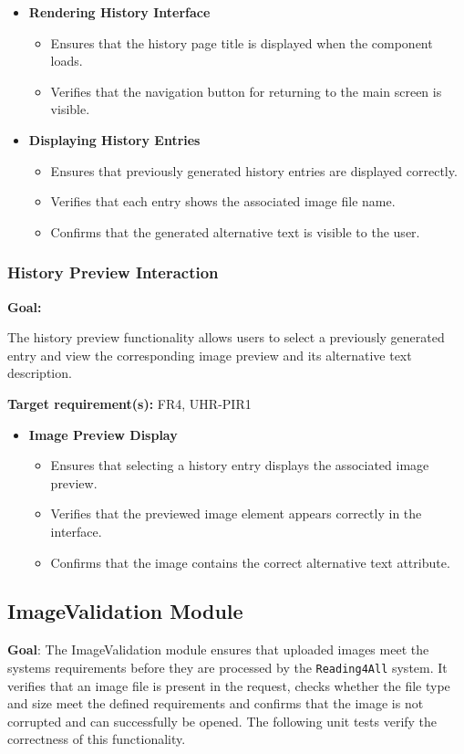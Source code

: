 \documentclass[12pt, titlepage]{article}
\begin{document}
\begin{itemize}

\item \textbf{Rendering History Interface}
\begin{itemize}
\item Ensures that the history page title is displayed when the component loads.
\item Verifies that the navigation button for returning to the main screen is visible.
\end{itemize}

\item \textbf{Displaying History Entries}
\begin{itemize}
\item Ensures that previously generated history entries are displayed correctly.
\item Verifies that each entry shows the associated image file name.
\item Confirms that the generated alternative text is visible to the user.
\end{itemize}

\end{itemize}

\subsubsection{History Preview Interaction}

\textbf{Goal:}

The history preview functionality allows users to select a previously generated
entry and view the corresponding image preview and its alternative text
description.

\textbf{Target requirement(s):} FR4, UHR-PIR1

\begin{itemize}

\item \textbf{Image Preview Display}
\begin{itemize}
\item Ensures that selecting a history entry displays the associated image preview.
\item Verifies that the previewed image element appears correctly in the interface.
\item Confirms that the image contains the correct alternative text attribute.
\end{itemize}

\end{itemize}
\subsection{ImageValidation Module}
\textbf{Goal}:
The ImageValidation module ensures that uploaded images meet the systems requirements before they are processed by the
\texttt{Reading4All} system. It verifies that an image file is present in the request, checks whether 
the file type and size meet the defined requirements and confirms that the image is not corrupted and can successfully be opened. 
The following unit tests verify the correctness of this functionality. 
\end{document}
